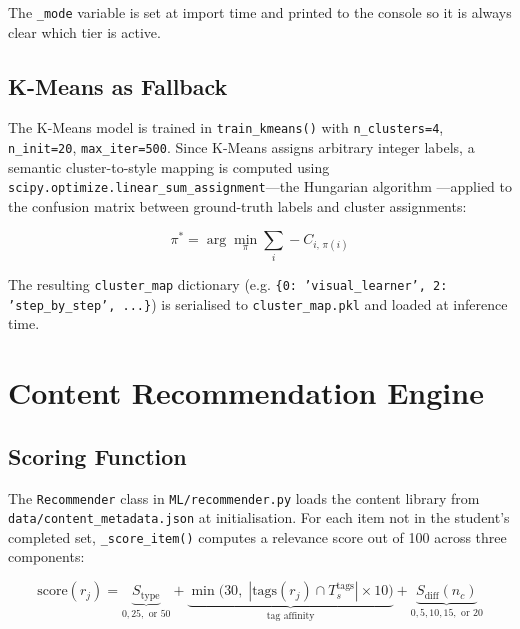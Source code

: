 \documentclass[12pt,a4paper]{article}
\begin{document}
The \texttt{\_mode} variable is set at import time and printed to
the console so it is always clear which tier is active.

\subsection{K-Means as Fallback}

The K-Means model is trained in \texttt{train\_kmeans()} with
\texttt{n\_clusters=4}, \texttt{n\_init=20}, \texttt{max\_iter=500}.
Since K-Means assigns arbitrary integer labels, a semantic
cluster-to-style mapping is computed using
\texttt{scipy.optimize.linear\_sum\_assignment}---the Hungarian
algorithm \cite{kuhn1955}---applied to the confusion matrix between
ground-truth labels and cluster assignments:

\begin{equation}
  \pi^* = \arg\min_\pi \sum_{i} -C_{i,\,\pi(i)}
\end{equation}

The resulting \texttt{cluster\_map} dictionary (e.g.
\texttt{\{0: 'visual\_learner', 2: 'step\_by\_step', ...\}})
is serialised to \texttt{cluster\_map.pkl} and loaded at inference
time.

\section{Content Recommendation Engine}

\subsection{Scoring Function}

The \texttt{Recommender} class in \texttt{ML/recommender.py} loads
the content library from \texttt{data/content\_metadata.json} at
initialisation. For each item not in the student's completed set,
\texttt{\_score\_item()} computes a relevance score out of 100
across three components:

\begin{equation}
  \text{score}(r_j) =
    \underbrace{S_{\text{type}}}_{0,25,\text{ or }50}
  + \underbrace{\min\!\bigl(30,\;|\text{tags}(r_j)
    \cap T_s^{\text{tags}}|\times 10\bigr)}_{\text{tag affinity}}
  + \underbrace{S_{\text{diff}}(n_c)}_{0,5,10,15,\text{ or }20}
\end{equation}
\end{document}
